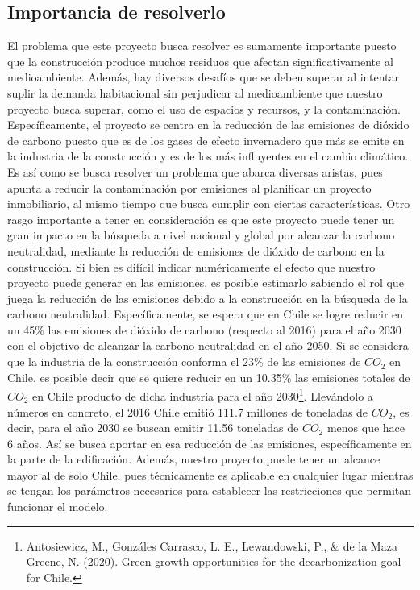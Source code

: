 \documentclass[letterpaper]{article}
\begin{document}
\subsection{Importancia de resolverlo}
El problema que este proyecto busca resolver es sumamente importante puesto que la construcción produce muchos residuos que afectan significativamente al medioambiente.
Además, hay diversos desafíos que se deben superar al intentar suplir la demanda habitacional sin perjudicar al medioambiente que nuestro proyecto busca superar, como el uso
de espacios y recursos, y la contaminación. Específicamente,  el proyecto se centra en la reducción de las emisiones de dióxido de carbono puesto que es de los gases de efecto
invernadero que más se emite en la industria de la construcción y es de los más influyentes en el cambio climático. Es así como se busca resolver un problema
que abarca diversas aristas, pues apunta a reducir la contaminación por emisiones al planificar un proyecto inmobiliario, al mismo tiempo que busca cumplir con ciertas
características. Otro rasgo importante a tener en consideración es que este proyecto puede tener un gran impacto en la búsqueda a nivel nacional y global por alcanzar la
carbono neutralidad, mediante la reducción de emisiones de dióxido de carbono en la construcción. Si bien es difícil indicar numéricamente el efecto que nuestro proyecto
puede generar en las emisiones, es posible estimarlo sabiendo el rol que juega la reducción de las emisiones debido a la construcción en la búsqueda de la carbono neutralidad.
Específicamente, se espera que en Chile se logre reducir en un 45\% las emisiones de dióxido de carbono (respecto al 2016) para el año 2030 con el objetivo de alcanzar
la carbono neutralidad en el año 2050. Si se considera que la industria de la construcción conforma el 23\% de las emisiones de $CO_{2}$ en Chile, es posible decir que
se quiere reducir en un 10.35\% las emisiones totales de $CO_{2}$ en Chile producto de dicha industria para el año 2030\footnote{Antosiewicz, M., Gonzáles Carrasco, L. E., Lewandowski, P., \& de la Maza Greene, N. (2020). Green growth opportunities for the decarbonization goal for Chile.}. Llevándolo a números en concreto,
el 2016 Chile emitió 111.7 millones de toneladas de $CO_{2}$, es decir, para el año 2030 se buscan emitir 11.56 toneladas de $CO_{2}$ menos que hace 6 años. Así se
busca aportar en esa reducción de las emisiones, específicamente en la parte de la edificación. Además, nuestro proyecto puede tener un alcance mayor al de solo Chile, pues técnicamente es aplicable
en cualquier lugar mientras se tengan los parámetros necesarios para establecer las restricciones que permitan funcionar el modelo.
\end{document}
